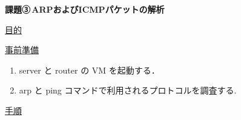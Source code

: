 \documentclass[dvipdfmx,autodetect-engine, 12pt]{jsarticle}
\begin{document}
\begin{center}

    {\LARGE \bfseries 課題③\,ARPおよびICMPパケットの解析\par}

\end{center}

\vspace{1cm}

{\LARGE \uline{目的}} 

\vspace{1cm}

{\LARGE \uline{事前準備}} 

\begin{enumerate}
    \item server と router の VM を起動する．
    \item arp と ping コマンドで利用されるプロトコルを調査する.
\end{enumerate}

\vspace{1cm}

{\LARGE \uline{手順}} 
\end{document}
